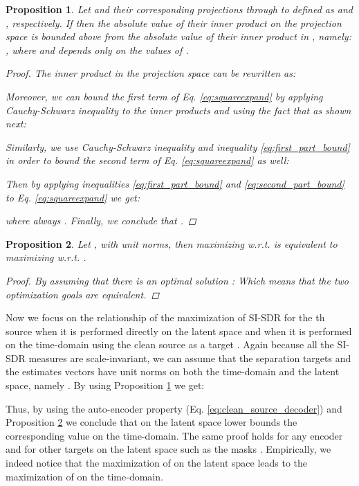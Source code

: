 \documentclass{article}
\newtheorem{prop}{Proposition}
\begin{document}
\begin{prop}
\label{lem:innerprod}
Let  and their corresponding projections through  to  defined as   and , respectively. If  then the absolute value of their inner product on the projection space  is bounded above from the absolute value of their inner product in , namely: , where  and depends only on the values of . 
\begin{proof}
The inner product in the projection space can be rewritten as:

Moreover, we can bound the first term of Eq. \ref{eq:squareexpand} by applying Cauchy-Schwarz inequality to the inner products and using the fact that  as shown next:

Similarly, we use Cauchy-Schwarz inequality and inequality \ref{eq:first_part_bound} in order to bound the second term of Eq. \ref{eq:squareexpand} as well:

Then by applying inequalities \ref{eq:first_part_bound} and \ref{eq:second_part_bound} to Eq. \ref{eq:squareexpand} we get:

where always . Finally, we conclude that . 
\end{proof}
\end{prop} 
\begin{prop}
\label{lem:sisdr}
Let , with unit norms, then maximizing  w.r.t.  is equivalent to maximizing   w.r.t. .
\begin{proof}
By assuming that there is an optimal solution :
Which means that the two optimization goals are equivalent. \end{proof}  \end{prop} 
\noindent Now we focus on the relationship of the maximization of SI-SDR for the th source when it is performed directly on the latent space  and when it is performed on the time-domain using the clean source as a target . Again because all the SI-SDR measures are scale-invariant, we can assume that the separation targets and the estimates vectors have unit norms on both the time-domain and the latent space, namely . By using Proposition \ref{lem:innerprod} we get:

Thus, by using the auto-encoder property (Eq. \ref{eq:clean_source_decoder}) and Proposition \ref{lem:sisdr} we conclude that  on the latent space lower bounds the corresponding value  on the time-domain. The same proof holds for any encoder  and for other targets on the latent space such as the masks . Empirically, we indeed notice that the maximization of   on the latent space leads to the maximization of  on the time-domain. 
\end{document}
